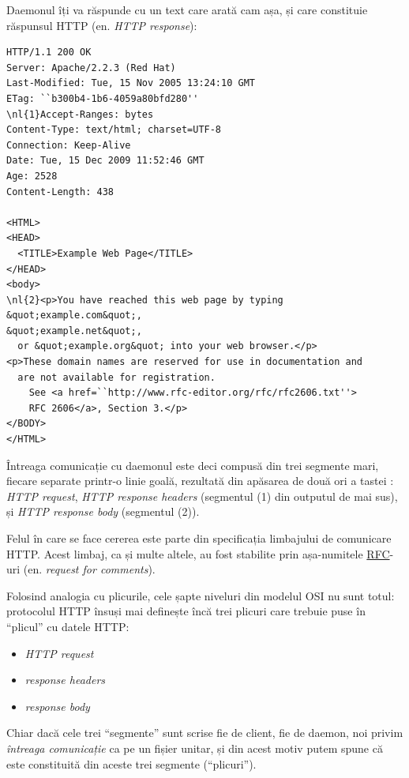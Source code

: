 Daemonul îți va răspunde cu un text care arată cam așa, și care constituie răspunsul
HTTP (en. \textsl{HTTP response}):
\begin{Verbatim}[commandchars=\\\{\}]
HTTP/1.1 200 OK
Server: Apache/2.2.3 (Red Hat)
Last-Modified: Tue, 15 Nov 2005 13:24:10 GMT
ETag: ``b300b4-1b6-4059a80bfd280''            
\nl{1}Accept-Ranges: bytes                        
Content-Type: text/html; charset=UTF-8      
Connection: Keep-Alive                      
Date: Tue, 15 Dec 2009 11:52:46 GMT         
Age: 2528                                   
Content-Length: 438

<HTML>
<HEAD>
  <TITLE>Example Web Page</TITLE>
</HEAD>                          
<body>                           
\nl{2}<p>You have reached this web page by typing &quot;example.com&quot;,
&quot;example.net&quot;,                                            
  or &quot;example.org&quot; into your web browser.</p>             
<p>These domain names are reserved for use in documentation and
  are not available for registration.
	See <a href=``http://www.rfc-editor.org/rfc/rfc2606.txt''>
	RFC 2606</a>, Section 3.</p>        
</BODY>                                                                           
</HTML>
\end{Verbatim}
Întreaga comunicație cu daemonul este deci compusă din trei segmente mari, fiecare separate
printr-o linie goală, rezultată din apăsarea de două ori a tastei :
\textsl{HTTP request}, \textsl{HTTP response headers} (segmentul (1) din outputul de mai sus),
și \textsl{HTTP response body} (segmentul (2)).

Felul în care se face cererea este parte din specificația
limbajului de comunicare HTTP. Acest limbaj, ca și multe altele, au fost stabilite
prin așa-numitele \href{http://en.wikipedia.org/wiki/Request_for_Comments}{RFC}-uri
(en. \textsl{request for comments}).

Folosind analogia cu plicurile, cele șapte niveluri din modelul OSI nu sunt totul:
protocolul HTTP însuși mai definește încă trei plicuri care trebuie puse în
``plicul'' cu datele HTTP:
\begin{itemize}
\item \textsl{HTTP request}
\item \textsl{response headers}
\item \textsl{response body}
\end{itemize}
Chiar dacă cele trei ``segmente'' sunt scrise fie de client, fie de daemon,
noi privim \textit{întreaga comunicație} ca pe un fișier unitar, și din acest motiv
putem spune că este constituită din aceste trei segmente (``plicuri'').

